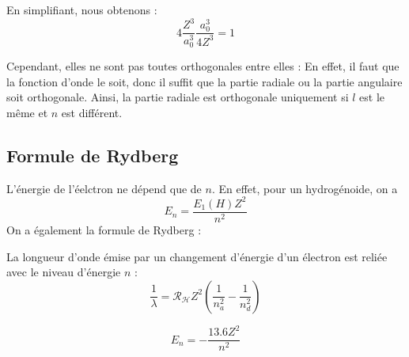 \documentclass[french]{yLectureNote}
\begin{document}
En simplifiant, nous obtenons :
\[ 4 \frac{Z^3}{a_0^3} \frac{a_0^3}{4Z^3} = 1 \]

Cependant, elles ne sont pas toutes orthogonales entre elles : En effet, il faut que la fonction d'onde le soit, donc il suffit que la partie radiale ou la partie angulaire soit orthogonale. Ainsi, la partie radiale est orthogonale uniquement si \(l\) est le même et \(n\) est différent.
\subsection{Formule de Rydberg}
L'énergie de l'éelctron ne dépend que de \(n\). En effet, pour un hydrogénoide, on a \[E_n = \frac{E_1(H)Z^2}{n^2}\]
On a également la formule de Rydberg :

\begin{theorem}
 La longueur d'onde émise par un changement d'énergie d'un électron est reliée avec le niveau d'énergie \(n\) : \[\frac{1}{\lambda}= \mathcal{R_H}Z^2(\frac{1}{n_a^2}-\frac{1}{n^2_d})\]
\end{theorem}
\begin{theorem}
 \[E_n = -\frac{13.6 Z^2}{n^2}\]
\end{theorem}
\end{document}
